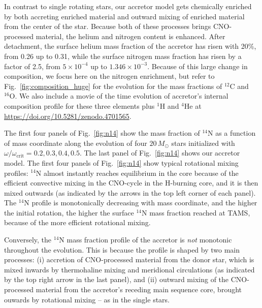 \documentclass[twocolumn,twocolappendix,trackchanges]{aastex63}
\DeclareRobustCommand{\Figref}[1]{Fig.~\ref{#1}}
\begin{document}
In contrast to single rotating stars, our accretor model gets chemically enriched by both accreting enriched material and outward mixing of enriched material from the center of the star. Because both of these processes brings CNO-processed material, the helium and nitrogen content is enhanced. After detachment, the surface helium mass fraction of the accretor has risen with 20\%, from 0.26 up to 0.31, while the surface nitrogen mass fraction has risen by a factor of 2.5, from $5\times 10^{-4}$ up to $1.346 \times 10^{-3}$. Because of this large change in composition, we focus here on the nitrogen enrichment, but refer to \Figref{fig:composition_huge} for the evolution for the mass fractions of $^{12}\mathrm{C}$ and $^{16}\mathrm{O}$. We also include a movie of the time evolution of accretor's internal composition profile for these three elements plus $^1\mathrm{H}$ and $^4\mathrm{He}$ at \url{https://doi.org/10.5281/zenodo.4701565}.

The first four panels of
\Figref{fig:n14} show the mass fraction of $^{14}\mathrm{N}$ as a
function of mass coordinate along the evolution of four $20\,M_\odot$
stars initialized with $\omega/\omega_\mathrm{crit}=0.2,0.3,0.4,0.5$.
The last panel of \Figref{fig:n14} shows our accretor model. 
The first four panels of \Figref{fig:n14} show typical rotational
mixing profiles: $^{14}\mathrm{N}$ almost instantly reaches equilibrium in the core because
of the efficient convective mixing in the CNO-cycle in the H-burning core, and it is then mixed outwards (as indicated by the
arrows in the top left corner of each panel). 
The $^{14}\mathrm{N}$ profile is monotonically decreasing with mass
coordinate, and the higher the initial rotation, the higher the
surface $^{14}\mathrm{N}$ mass fraction reached at TAMS, because of the
more efficient rotational mixing. 

Conversely, the $^{14}\mathrm{N}$ mass fraction profile of the
accretor is \emph{not} monotonic throughout the evolution.  This is because the
profile is shaped by two main processes: (i) accretion of
CNO-processed material from the donor star, which is mixed inwards by thermohaline mixing and meridional
circulations (as indicated by the top right
arrow in the last panel), and (ii) outward mixing of the CNO-processed
material from the accretor's receding main sequence core, brought ouwards by rotational mixing -- as in
the single stars. %
\end{document}
